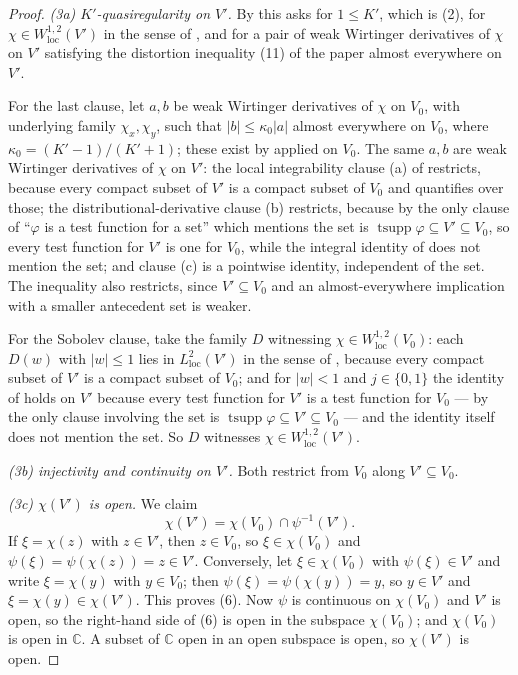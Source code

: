 \begin{proof}
\emph{(3a) $K'$-quasiregularity on $V'$.}  By  this
asks for $1\le K'$, which is (2), for $\chi\in W^{1,2}_{\mathrm{loc}}(V')$ in
the sense of , and for a pair of weak Wirtinger derivatives
of $\chi$ on $V'$ satisfying the distortion inequality (11) of the paper almost
everywhere on $V'$.

For the last clause, let $a,b$ be weak Wirtinger derivatives of $\chi$ on
$V_0$, with underlying family $\chi_x,\chi_y$, such that
$|b|\le\kappa_0|a|$ almost everywhere on $V_0$, where
$\kappa_0=(K'-1)/(K'+1)$; these exist by  applied on
$V_0$.  The same $a,b$ are weak Wirtinger derivatives of $\chi$ on $V'$: the
local integrability clause (a) of  restricts,
because every compact subset of $V'$ is a compact subset of $V_0$ and
 quantifies over those; the distributional-derivative
clause (b) restricts, because by  the only clause of
``$\varphi$ is a test function for a set'' which mentions the set is
$\operatorname{tsupp}\varphi\subseteq V'\subseteq V_0$, so every test function
for $V'$ is one for $V_0$, while the integral identity of
 does not mention the set; and clause (c) is a
pointwise identity, independent of the set.  The inequality also restricts,
since $V'\subseteq V_0$ and an almost-everywhere implication with a smaller
antecedent set is weaker.

For the Sobolev clause, take the family $D$
witnessing $\chi\in W^{1,2}_{\mathrm{loc}}(V_0)$: each $D(w)$ with $|w|\le1$
lies in $L^{2}_{\mathrm{loc}}(V')$ in the sense of ,
because every compact subset of $V'$ is a compact subset of $V_0$; and for
$|w|<1$ and $j\in\{0,1\}$ the identity of  holds on
$V'$ because every test function for $V'$ is a test function for $V_0$ --- by
 the only clause involving the set is
$\operatorname{tsupp}\varphi\subseteq V'\subseteq V_0$ --- and the identity
itself does not mention the set.  So $D$ witnesses
$\chi\in W^{1,2}_{\mathrm{loc}}(V')$.

\emph{(3b) injectivity and continuity on $V'$.}  Both restrict from $V_0$
along $V'\subseteq V_0$.

\emph{(3c) $\chi(V')$ is open.}  We claim
\begin{equation}\tag{6}
  \chi(V')=\chi(V_0)\cap\psi^{-1}(V') .
\end{equation}
If $\xi=\chi(z)$ with $z\in V'$, then $z\in V_0$, so $\xi\in\chi(V_0)$ and
$\psi(\xi)=\psi(\chi(z))=z\in V'$.  Conversely, let $\xi\in\chi(V_0)$ with
$\psi(\xi)\in V'$ and write $\xi=\chi(y)$ with $y\in V_0$; then
$\psi(\xi)=\psi(\chi(y))=y$, so $y\in V'$ and $\xi=\chi(y)\in\chi(V')$.  This
proves (6).  Now $\psi$ is continuous on $\chi(V_0)$ and $V'$ is open, so the
right-hand side of (6) is open in the subspace $\chi(V_0)$; and $\chi(V_0)$ is
open in $\mathbb{C}$.  A subset of $\mathbb{C}$ open in an open subspace is
open, so $\chi(V')$ is open.


\end{proof}
